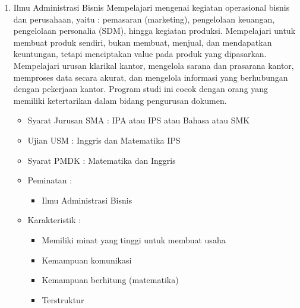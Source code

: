 \documentclass[a4paper,twoside]{article}
\begin{document}
\begin{enumerate}
\begin{enumerate}
\begin{enumerate}
				\item Ilmu Administrasi Bisnis
					Mempelajari mengenai kegiatan operasional bisnis dan perusahaan, yaitu : pemasaran (marketing), pengelolaan keuangan, pengelolaan personalia (SDM), hingga kegiatan produksi. Mempelajari untuk membuat produk sendiri, bukan membuat, menjual, dan mendapatkan keuntungan, tetapi menciptakan value pada produk yang dipasarkan.  Mempelajari urusan klarikal kantor, mengelola sarana dan prasarana kantor, memproses data secara akurat, dan mengelola informasi yang berhubungan dengan pekerjaan kantor. Program studi ini cocok dengan orang yang memiliki ketertarikan dalam bidang pengurusan dokumen.
					\begin{itemize}
						\item Syarat Jurusan SMA : IPA atau IPS atau Bahasa atau SMK
						\item Ujian USM : Inggris dan Matematika IPS
						\item Syarat PMDK : Matematika dan Inggris
						\item Peminatan :
						\begin{itemize}
							\item Ilmu Administrasi Bisnis
						\end{itemize}
						\item Karakteristik :
						\begin{itemize}
							\item Memiliki minat yang tinggi untuk membuat usaha
							\item Kemampuan komunikasi
							\item Kemampuan berhitung (matematika)
							\item Terstruktur
						\end{itemize}
					\end{itemize}
					

\end{enumerate}
\end{enumerate}
\end{enumerate}
\end{document}
